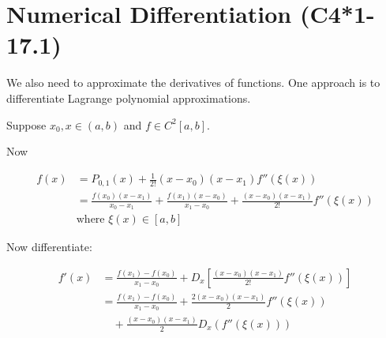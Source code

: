 
\section{Numerical Differentiation (C4*1-17.1)}\label{sec:numerical_differentiation}

We also need to approximate the derivatives of functions. One approach is to
differentiate Lagrange polynomial approximations.

Suppose $x_0, x \in (a, b)$ and $f\in C^2[a,b]$.

Now

\begin{align*}
    f(x) &= P_{0,1}(x) + \frac{1}{2!} (x - x_0)(x - x_1) f''(\xi(x)) \\
         &= \frac{f(x_0)(x - x_1)}{x_0 - x_1} + \frac{f(x_1)(x - x_0)}{x_1 - x_0} 
         + \frac{(x - x_0)(x - x_1)}{2!} f''(\xi(x)) \\
         &\text{where } \xi(x) \in [a, b]
\end{align*}

Now differentiate:

\begin{align*}
    f'(x) &= \frac{f(x_1) - f(x_0)}{x_1 - x_0} + D_x \left[ \frac{(x - x_0)(x - x_1)}{2!} f''(\xi(x)) \right] \\
          &= \frac{f(x_1) - f(x_0)}{x_1 - x_0} + \frac{2 (x - x_0)(x - x_1)}{2} f''(\xi(x)) \\
          &\quad + \frac{(x - x_0)(x - x_1)}{2} D_x \left( f''(\xi(x)) \right)
\end{align*}

